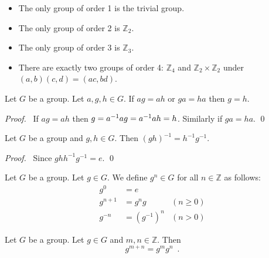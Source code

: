 \begin{ex}
    \begin{itemize}
        \item The only group of order 1 is the trivial group.
        \item The only group of order 2 is $\mathbb{Z}_2$.
        \item The only group of order 3 is $\mathbb{Z}_3$.
        \item There are exactly two groups of order 4: $\mathbb{Z}_4$ and $\mathbb{Z}_2
                  \times \mathbb{Z}_2$ under $(a,b) (c,d) = (ac,bd)$.
    \end{itemize}
\end{ex}

\begin{prop}[Cancellation]
    Let $G$ be a group. Let $a,g,h \in G$. If $ag = ah$ or $ga = ha$ then $g = h$.
\end{prop}

\begin{proof}
    \pf\ If $ag = ah$ then $g = {a}^{-1} a g = {a}^{-1} a h = h$. Similarly if $ga = ha$. \qed
\end{proof}

\begin{prop}
    Let $G$ be a group and $g,h \in G$. Then $(gh)^{-1} = h^{-1}g^{-1}$.
\end{prop}

\begin{proof}
    \pf\ Since $ghh^{-1}g^{-1} = e$. \qed
\end{proof}

\begin{df}
\label{df:power-in-group}
    Let $G$ be a group. Let $g \in G$. We define $g^n \in G$ for all $n \in \mathbb{Z}$ as follows:
    \begin{align*}
        g^0     & = e                       \\
        g^{n+1} & = g^n g      & (n \geq 0) \\
        g^{-n}  & = (g^{-1})^n & (n > 0)
    \end{align*}
\end{df}

\begin{prop}
    \label{prop:power-add}
    Let $G$ be a group. Let $g \in G$ and $m,n \in \mathbb{Z}$. Then
    \[ g^{m+n} = g^m g^n \enspace . \]
\end{prop}

